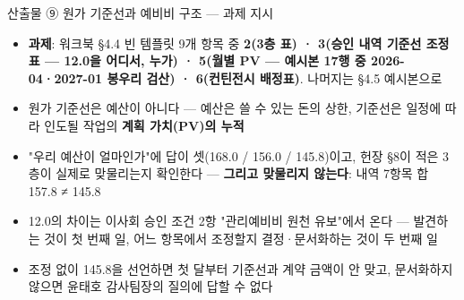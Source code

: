 \begin{frame}{산출물 ⑨ 원가 기준선과 예비비 구조 — 과제 지시}
\begin{itemize}
\item \textbf{과제}: 워크북 §4.4 빈 템플릿 9개 항목 중 \textbf{2(3층 표) · 3(승인 내역 \ra{} 기준선 조정표 — 12.0을 어디서, 누가) · 5(월별 PV — 예시본 17행 중 2026-04·2027-01 봉우리 검산) · 6(컨틴전시 배정표)}. 나머지는 §4.5 예시본으로
\item 원가 기준선은 예산이 아니다 — 예산은 쓸 수 있는 돈의 상한, 기준선은 일정에 따라 인도될 작업의 \textbf{계획 가치(PV)의 누적}
\item "우리 예산이 얼마인가"에 답이 셋(168.0 / 156.0 / 145.8)이고, 헌장 §8이 적은 3층이 실제로 맞물리는지 확인한다 — \textbf{그리고 맞물리지 않는다}: 내역 7항목 합 157.8 ≠ 145.8
\item 12.0의 차이는 이사회 승인 조건 2항 "관리예비비 원천 유보"에서 온다 — 발견하는 것이 첫 번째 일, 어느 항목에서 조정할지 결정·문서화하는 것이 두 번째 일
\item 조정 없이 145.8을 선언하면 첫 달부터 기준선과 계약 금액이 안 맞고, 문서화하지 않으면 윤태호 감사팀장의 질의에 답할 수 없다
\end{itemize}
\end{frame}

